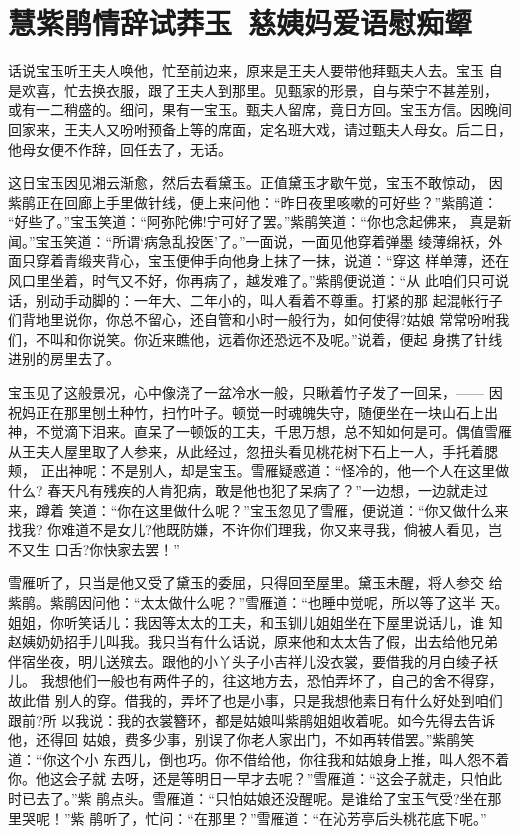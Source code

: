 \chapter{慧紫鹃情辞试莽玉~慈姨妈爱语慰痴颦}

话说宝玉听王夫人唤他，忙至前边来，原来是王夫人要带他拜甄夫人去。宝玉
自是欢喜，忙去换衣服，跟了王夫人到那里。见甄家的形景，自与荣宁不甚差别，
或有一二稍盛的。细问，果有一宝玉。甄夫人留席，竟日方回。宝玉方信。因晚间
回家来，王夫人又吩咐预备上等的席面，定名班大戏，请过甄夫人母女。后二日，
他母女便不作辞，回任去了，无话。

这日宝玉因见湘云渐愈，然后去看黛玉。正值黛玉才歇午觉，宝玉不敢惊动，
因紫鹃正在回廊上手里做针线，便上来问他：“昨日夜里咳嗽的可好些？”紫鹃道：
“好些了。”宝玉笑道：“阿弥陀佛!宁可好了罢。”紫鹃笑道：“你也念起佛来，
真是新闻。”宝玉笑道：“所谓‘病急乱投医’了。”一面说，一面见他穿着弹墨
绫薄绵袄，外面只穿着青缎夹背心，宝玉便伸手向他身上抹了一抹，说道：“穿这
样单薄，还在风口里坐着，时气又不好，你再病了，越发难了。”紫鹃便说道：“从
此咱们只可说话，别动手动脚的：一年大、二年小的，叫人看着不尊重。打紧的那
起混帐行子们背地里说你，你总不留心，还自管和小时一般行为，如何使得?姑娘
常常吩咐我们，不叫和你说笑。你近来瞧他，远着你还恐远不及呢。”说着，便起
身携了针线进别的房里去了。

宝玉见了这般景况，心中像浇了一盆冷水一般，只瞅着竹子发了一回呆，——
因祝妈正在那里刨土种竹，扫竹叶子。顿觉一时魂魄失守，随便坐在一块山石上出
神，不觉滴下泪来。直呆了一顿饭的工夫，千思万想，总不知如何是可。偶值雪雁
从王夫人屋里取了人参来，从此经过，忽扭头看见桃花树下石上一人，手托着腮颊，
正出神呢：不是别人，却是宝玉。雪雁疑惑道：“怪冷的，他一个人在这里做什么?
春天凡有残疾的人肯犯病，敢是他也犯了呆病了？”一边想，一边就走过来，蹲着
笑道：“你在这里做什么呢？”宝玉忽见了雪雁，便说道：“你又做什么来找我?
你难道不是女儿?他既防嫌，不许你们理我，你又来寻我，倘被人看见，岂不又生
口舌?你快家去罢！”

雪雁听了，只当是他又受了黛玉的委屈，只得回至屋里。黛玉未醒，将人参交
给紫鹃。紫鹃因问他：“太太做什么呢？”雪雁道：“也睡中觉呢，所以等了这半
天。姐姐，你听笑话儿：我因等太太的工夫，和玉钏儿姐姐坐在下屋里说话儿，谁
知赵姨奶奶招手儿叫我。我只当有什么话说，原来他和太太告了假，出去给他兄弟
伴宿坐夜，明儿送殡去。跟他的小丫头子小吉祥儿没衣裳，要借我的月白绫子袄儿。
我想他们一般也有两件子的，往这地方去，恐怕弄坏了，自己的舍不得穿，故此借
别人的穿。借我的，弄坏了也是小事，只是我想他素日有什么好处到咱们跟前?所
以我说：我的衣裳簪环，都是姑娘叫紫鹃姐姐收着呢。如今先得去告诉他，还得回
姑娘，费多少事，别误了你老人家出门，不如再转借罢。”紫鹃笑道：“你这个小
东西儿，倒也巧。你不借给他，你往我和姑娘身上推，叫人怨不着你。他这会子就
去呀，还是等明日一早才去呢？”雪雁道：“这会子就走，只怕此时已去了。”紫
鹃点头。雪雁道：“只怕姑娘还没醒呢。是谁给了宝玉气受?坐在那里哭呢！”紫
鹃听了，忙问：“在那里？”雪雁道：“在沁芳亭后头桃花底下呢。”

